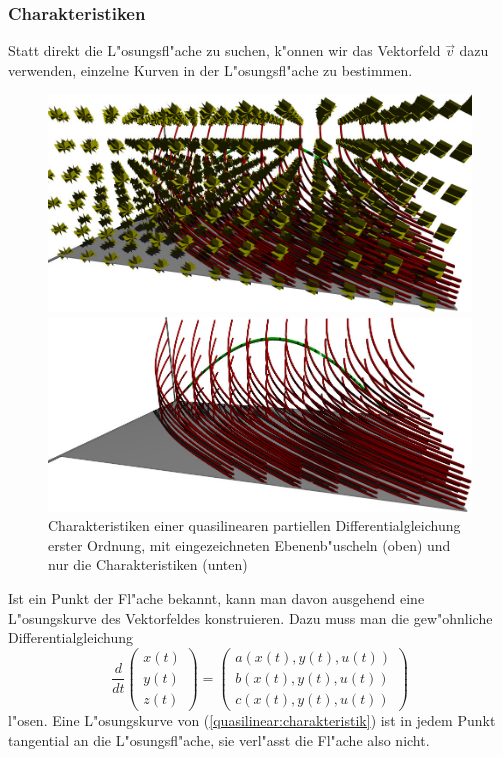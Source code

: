 \subsubsection{Charakteristiken}
Statt direkt die L"osungsfl"ache zu suchen, k"onnen wir das Vektorfeld
$\vec v$ dazu verwenden, einzelne Kurven in der L"osungsfl"ache
zu bestimmen.
\begin{figure}
\begin{center}
\includegraphics[width=\hsize]{3d/chrpl.jpg}
\end{center}
\begin{center}
\includegraphics[width=\hsize]{3d/chr.jpg}
\end{center}
\caption{Charakteristiken einer quasilinearen partiellen Differentialgleichung
erster Ordnung, mit eingezeichneten Ebenenb"uscheln (oben) und nur die
Charakteristiken (unten)\label{geometrie:charekeristiken-mit-buescheln}}
\end{figure}
Ist ein Punkt der Fl"ache bekannt,
kann man davon ausgehend eine L"osungskurve des Vektorfeldes konstruieren.
Dazu muss man die gew"ohnliche Differentialgleichung
\begin{equation}
\frac{d}{dt}\begin{pmatrix}x(t)\\y(t)\\z(t)\end{pmatrix}
=
\begin{pmatrix}
a(x(t),y(t),u(t))\\b(x(t),y(t),u(t))\\c(x(t),y(t),u(t))
\end{pmatrix}
\label{quasilinear:charakteristik}
\end{equation}
l"osen.
Eine L"osungskurve von (\ref{quasilinear:charakteristik}) ist in jedem
Punkt tangential an die L"osungsfl"ache, sie verl"asst die Fl"ache also
nicht.

